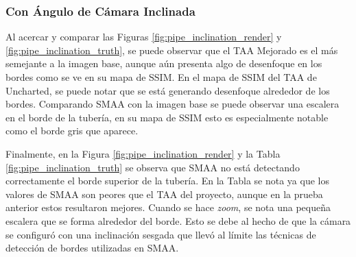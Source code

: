 \documentclass[pregrado]{tesis-usb} %
\begin{document}
\FloatBarrier

\subsubsection{Con Ángulo de Cámara Inclinada}
Al acercar y comparar las Figuras \ref{fig:pipe_inclination_render} y \ref{fig:pipe_inclination_truth}, se puede observar que el TAA Mejorado es el más semejante a la imagen base, aunque aún presenta algo de desenfoque en los bordes como se ve en su mapa de SSIM. En el mapa de SSIM del TAA de Uncharted, se puede notar que se está generando desenfoque alrededor de los bordes. Comparando SMAA con la imagen base se puede observar una escalera en el borde de la tubería, en su mapa de SSIM esto es especialmente notable como el borde gris que aparece.

Finalmente, en la Figura \ref{fig:pipe_inclination_render} y la Tabla \ref{fig:pipe_inclination_truth} se observa que SMAA no está detectando correctamente el borde superior de la tubería. En la Tabla se nota ya que los valores de SMAA son peores que el TAA del proyecto, aunque en la prueba anterior estos resultaron mejores. Cuando se hace \textit{zoom}, se nota una pequeña escalera que se forma alrededor del borde. Esto se debe al hecho de que la cámara se configuró con una inclinación sesgada que llevó al límite las técnicas de detección de bordes utilizadas en SMAA.
\end{document}
